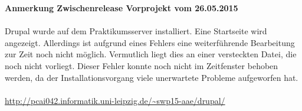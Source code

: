 \documentclass{swp}
\begin{document}
\\\\\\\\\\

\textbf{Anmerkung Zwischenrelease Vorprojekt vom 26.05.2015}\\\\
Drupal wurde auf dem Praktikumsserver installiert. Eine Startseite wird angezeigt. Allerdings ist aufgrund eines Fehlers eine weiterf\"uhrende Bearbeitung zur Zeit noch nicht m\"oglich. Vermutlich liegt dies an einer versteckten Datei, die noch nicht vorliegt. Dieser Fehler konnte noch nicht im Zeitfenster behoben werden, da der Installationsvorgang viele unerwartete Probleme aufgeworfen hat.\\\\
\url{http://pcai042.informatik.uni-leipzig.de/~swp15-aae/drupal/}
\end{document}
